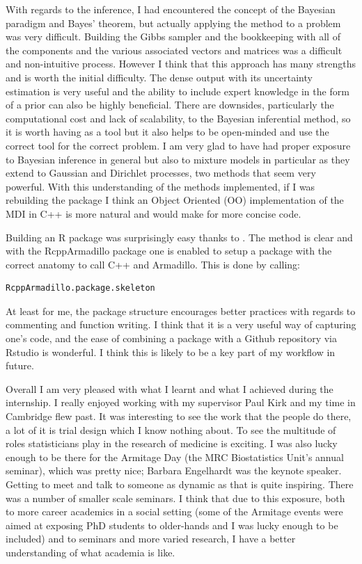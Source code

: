\documentclass[11pt]{article} %
\begin{document}
With regards to the inference, I had encountered the concept of the Bayesian paradigm and Bayes' theorem, but actually applying the method to a problem was very difficult. Building the Gibbs sampler and the bookkeeping with all of the components and the various associated vectors and matrices was a difficult and non-intuitive process. However I think that this approach has many strengths and is worth the initial difficulty. The dense output with its uncertainty estimation is very useful and the ability to include expert knowledge in the form of a prior can also be highly beneficial. There are downsides, particularly the computational cost and lack of scalability, to the Bayesian inferential method, so it is worth having as a tool but it also helps to be open-minded and use the correct tool for the correct problem. I am very glad to have had proper exposure to Bayesian inference in general but also to mixture models in particular as they extend to Gaussian and Dirichlet processes, two methods that seem very powerful. With this understanding of the methods implemented, if I was rebuilding the package I think an Object Oriented (OO) implementation of the MDI in C++ is more natural and would make for more concise code.

Building an R package was surprisingly easy thanks to \citet{Wickhampackagesorganizetest2015}. The method is clear and with the RcppArmadillo package one is enabled to setup a package with the correct anatomy to call C++ and Armadillo. This is done by calling:
\begin{lstlisting}
RcppArmadillo.package.skeleton
\end{lstlisting}
At least for me, the package structure encourages better practices with regards to commenting and function writing. I think that it is a very useful way of capturing one's code, and the ease of combining a package with a Github repository via Rstudio is wonderful. I think this is likely to be a key part of my workflow in future.

Overall I am very pleased with what I learnt and what I achieved during the internship. I really enjoyed working with my supervisor Paul Kirk and my time in Cambridge flew past. It was interesting to see the work that the people do there, a lot of it is trial design which I know nothing about. To see the multitude of roles statisticians play in the research of medicine is exciting. I was also lucky enough to be there for the Armitage Day (the MRC Biostatistics Unit's annual seminar), which was pretty nice; Barbara Engelhardt was the keynote speaker. Getting to meet and talk to someone as dynamic as that is quite inspiring. There was a number of smaller scale seminars. I think that due to this exposure, both to more career academics in a social setting (some of the Armitage events were aimed at exposing PhD students to older-hands and I was lucky enough to be included) and to seminars and more varied research, I have a better understanding of what academia is like.
\end{document}
